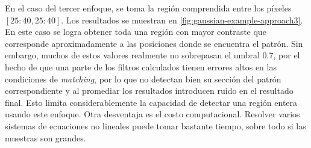 En el caso del tercer enfoque, se toma la región comprendida entre los píxeles $[25:40,25:40]$. Los resultados 
se muestran en \ref{fig:gaussian-example-approach3}. En este caso se logra obtener toda una región con mayor 
contraste que corresponde aproximadamente a las posiciones donde se encuentra el patrón. 
Sin embargo, muchos de estos valores realmente no sobrepasan el umbral $0.7$,
por el hecho de que una parte de los filtros calculados tienen errores altos en las condiciones de \textit{matching}, 
por lo que no detectan bien su sección del patrón correspondiente y al promediar los resultados introducen 
ruido en el resultado final.
Esto limita considerablemente la capacidad de detectar una región entera usando este enfoque. Otra desventaja es el costo
computacional. Resolver varios sistemas de ecuaciones no lineales puede tomar bastante tiempo, sobre todo si las 
muestras son grandes.

